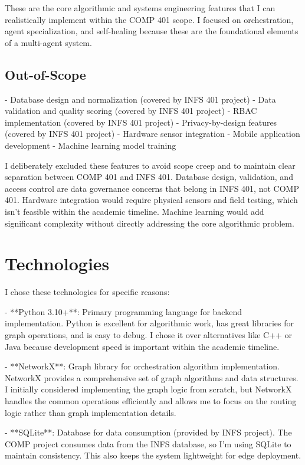 These are the core algorithmic and systems engineering features that I can realistically implement within the COMP 401 scope. I focused on orchestration, agent specialization, and self-healing because these are the foundational elements of a multi-agent system.

\subsection{Out-of-Scope}
- Database design and normalization (covered by INFS 401 project)
- Data validation and quality scoring (covered by INFS 401 project)
- RBAC implementation (covered by INFS 401 project)
- Privacy-by-design features (covered by INFS 401 project)
- Hardware sensor integration
- Mobile application development
- Machine learning model training

I deliberately excluded these features to avoid scope creep and to maintain clear separation between COMP 401 and INFS 401. Database design, validation, and access control are data governance concerns that belong in INFS 401, not COMP 401. Hardware integration would require physical sensors and field testing, which isn't feasible within the academic timeline. Machine learning would add significant complexity without directly addressing the core algorithmic problem.

\section{Technologies}

I chose these technologies for specific reasons:

- **Python 3.10+**: Primary programming language for backend implementation. Python is excellent for algorithmic work, has great libraries for graph operations, and is easy to debug. I chose it over alternatives like C++ or Java because development speed is important within the academic timeline.

- **NetworkX**: Graph library for orchestration algorithm implementation. NetworkX provides a comprehensive set of graph algorithms and data structures. I initially considered implementing the graph logic from scratch, but NetworkX handles the common operations efficiently and allows me to focus on the routing logic rather than graph implementation details.

- **SQLite**: Database for data consumption (provided by INFS project). The COMP project consumes data from the INFS database, so I'm using SQLite to maintain consistency. This also keeps the system lightweight for edge deployment.


